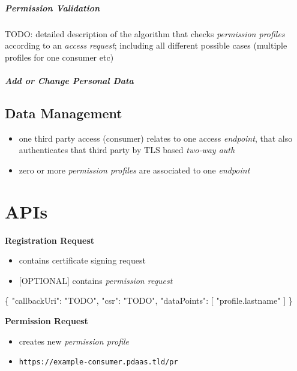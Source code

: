\documentclass[12pt,english,a4paper,titlepage,cleardoublepage=empty,dottedtoc]{report}
\newenvironment{Shaded}{\begin{snugshade}}{\end{snugshade}}
\newcommand{\DataTypeTok}[1]{\textcolor[rgb]{0.13,0.29,0.53}{{#1}}}
\newcommand{\StringTok}[1]{\textcolor[rgb]{0.31,0.60,0.02}{{#1}}}
\newcommand{\OtherTok}[1]{\textcolor[rgb]{0.56,0.35,0.01}{{#1}}}
\newcommand{\FunctionTok}[1]{\textcolor[rgb]{0.00,0.00,0.00}{{#1}}}
\providecommand{\tightlist}{%
  \setlength{\itemsep}{0pt}\setlength{\parskip}{0pt}}
\begin{document}
\subparagraph{Permission Validation}\label{permission-validation}

TODO: detailed description of the algorithm that checks \emph{permission
profiles} according to an \emph{access request}; including all different
possible cases (multiple profiles for one consumer etc)

\subparagraph{Add or Change Personal
Data}\label{add-or-change-personal-data}

\subsection{Data Management}\label{data-management}

\begin{itemize}
\tightlist
\item
  one third party access (consumer) relates to one access
  \emph{endpoint}, that also authenticates that third party by TLS based
  \emph{two-way auth}
\item
  zero or more \emph{permission profiles} are associated to one
  \emph{endpoint}
\end{itemize}

\section{APIs}\label{apis}

\textbf{Registration Request}

\begin{itemize}
\tightlist
\item
  contains certificate signing request
\item
  {[}OPTIONAL{]} contains \emph{permission request}
\end{itemize}

\begin{Shaded}
\begin{Highlighting}[]
\FunctionTok{\{}
    \DataTypeTok{"callbackUri"}\FunctionTok{:} \StringTok{"TODO"}\FunctionTok{,}
    \DataTypeTok{"csr"}\FunctionTok{:} \StringTok{"TODO"}\FunctionTok{,}
    \DataTypeTok{"dataPoints"}\FunctionTok{:} \OtherTok{[}
        \StringTok{"profile.lastname"}
    \OtherTok{]}
\FunctionTok{\}}
\end{Highlighting}
\end{Shaded}

\textbf{Permission Request}

\begin{itemize}
\tightlist
\item
  creates new \emph{permission profile}
\item
  \texttt{https://example-consumer.pdaas.tld/pr}
\end{itemize}
\end{document}
